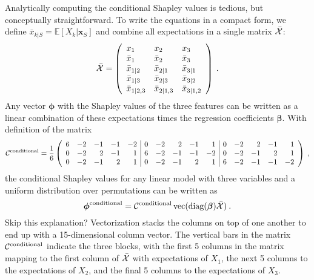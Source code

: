 \documentclass{article}
\newcommand{\vX}{\mathbf{X}}
\newcommand{\vx}{\mathbf{x}}
\newcommand{\expectation}{\mathbb{E}}
\newcommand{\contribution}{{\phi}}
\newcommand{\dodo}{\mathit{do}}
\newcommand{\lvdo}[1]{\dodo(\vX_{#1} = \vx_{#1})}
\newcommand{\bx}{\bar{x}}
\newcommand{\hx}{\hat{x}}
\newcommand{\allmeans}{{\cal X}}
\newcommand{\diagbeta}{{\cal B}}
\newcommand{\contmat}{{\cal C}}
\newcommand{\boven}[2]{#1^{\mbox{\scriptsize #2}}}
\newcommand{\comment}[1]{{\color{red} #1}}
\begin{document}
Analytically computing the conditional Shapley values is tedious, but conceptually straightforward. To write the equations in a compact form, we define $\bx_{k|S} = \expectation[X_k|\vx_{S}]$ and combine all expectations in a single matrix $\bar{\allmeans}$:
\[
\bar{\allmeans} = \left(\begin{array}{lll}
x_1 & x_2 & x_3 \\
\bx_1 & \bx_2 & \bx_3 \\
\bx_{1|2} & \bx_{2|1} & \bx_{3|1} \\
\bx_{1|3} & \bx_{2|3} & \bx_{3|2} \\
\bx_{1|2,3} &  \bx_{2|1,3} & \bx_{3|1,2}
\end{array}\right)
\: .
\]
Any vector $\bm{\contribution}$ with the Shapley values of the three features can be written as a linear combination of these expectations times the regression coefficients $\bm{\beta}$.
With definition of the matrix
\[
\boven{\contmat}{conditional} = {1 \over 6} \left(\begin{array}{rrrrr|rrrrr|rrrrr}
6 & -2 & -1 & -1 & -2  &
0 & -2 & 2 & -1 & 1  &
0 & -2 & 2 & -1 & 1 \\ 
0 & -2 & 2 & -1 & 1  &
6 & -2 & -1 & -1 & -2  &
0 & -2 & -1 & 2 & 1 \\ 
0 & -2 & -1 & 2 & 1  &
0 & -2 & -1 & 2 & 1  &
6 & -2 & -1 & -1 & -2
\end{array}\right) \: ,
\]
the conditional Shapley values for any linear model with three variables and a uniform distribution over permutations can be written as
\begin{equation}
\boven{\bm{\contribution}}{conditional} = \boven{\contmat}{conditional}  \mathop{\textrm{vec}}(\mathop{\textrm{diag}}(\bm{\beta}) \bar{\allmeans}) \: .
\label{eq:shapvec}
\end{equation}
\comment{Skip this explanation?}
Vectorization stacks the columns on top of one another to end up with a 15-dimensional column vector. The vertical bars in the matrix $\boven{\contmat}{conditional}$ indicate the three blocks, with the first 5 columns in the matrix mapping to the first column of $\bar{\allmeans}$ with expectations of $X_1$, the next 5 columns to the expectations of $X_2$, and the final 5 columns to the expectations of $X_3$.
\end{document}
